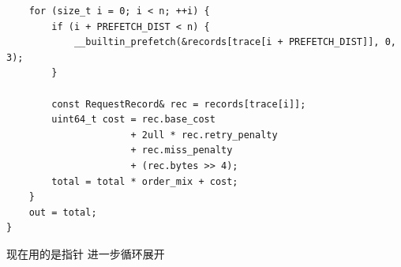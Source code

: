 \documentclass[11pt, a4paper]{article}
\begin{document}
\begin{aibox}
\begin{tcolorbox}[colback=white,colframe=gray!50!white,boxrule=0.5pt,arc=2pt,left=5pt,right=5pt,top=5pt,bottom=5pt]
\begin{verbatim}
    for (size_t i = 0; i < n; ++i) {
        if (i + PREFETCH_DIST < n) {
            __builtin_prefetch(&records[trace[i + PREFETCH_DIST]], 0, 3);
        }
        
        const RequestRecord& rec = records[trace[i]];
        uint64_t cost = rec.base_cost 
                      + 2ull * rec.retry_penalty 
                      + rec.miss_penalty 
                      + (rec.bytes >> 4);
        total = total * order_mix + cost;
    }
    out = total;
}
\end{verbatim}
\end{tcolorbox}
\end{aibox}

\vspace{1.5em}

\begin{userbox}
现在用的是指针 进一步循环展开
\end{userbox}
\end{document}
